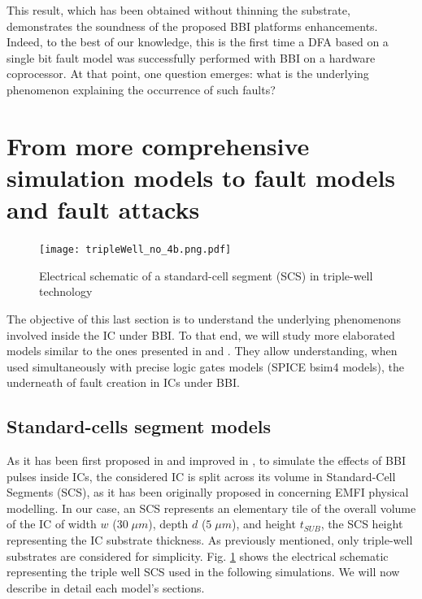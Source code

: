 \documentclass[10pt, conference, compsocconf]{IEEEtran}
\begin{document}
This result, which has been obtained without thinning the substrate, demonstrates the soundness of the proposed BBI platforms enhancements.
Indeed, to the best of our knowledge, this is the first time a DFA based on a single bit fault model was successfully performed with BBI on a hardware coprocessor.
At that point, one question emerges: what is the underlying phenomenon explaining the occurrence of such faults?

\section{From more comprehensive simulation models to fault models and fault attacks}
\label{section:attacks}

\begin{figure}[!ht]
\centering
\texttt{[image: tripleWell\_no\_4b.png.pdf]}
\caption{Electrical schematic of a standard-cell segment (SCS) in triple-well technology}
\label{stdCell}
\end{figure}

The objective of this last section is to understand the underlying phenomenons involved inside the IC under BBI.
To that end, we will study more elaborated models similar to the ones presented in \cite{mybbi1} and \cite{mybbi2}.
They allow understanding, when used simultaneously with precise logic gates models (SPICE bsim4 models), the underneath of fault creation in ICs under BBI.

\subsection{Standard-cells segment models}
\label{subsection:scsModel}

As it has been first proposed in \cite{mybbi1} and improved in \cite{mybbi2}, to simulate the effects of BBI pulses inside ICs, the considered IC is split across its volume in Standard-Cell Segments (SCS), as it has been originally proposed in \cite{mathieuEMFI} concerning EMFI physical modelling.
In our case, an SCS represents an elementary tile of the overall volume of the IC of width $w$ ($30 \; \mu m$), depth $d$ ($5 \; \mu m$), and height $t_{SUB}$, the SCS height representing the IC substrate thickness.
As previously mentioned, only triple-well substrates are considered for simplicity.
Fig. \ref{stdCell} shows the electrical schematic representing the triple well SCS used in the following simulations.
We will now describe in detail each model's sections.
\end{document}
